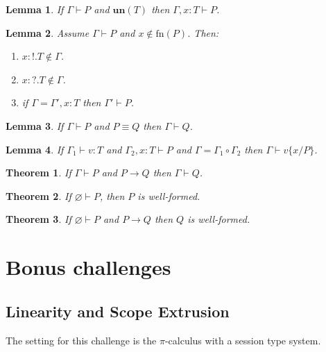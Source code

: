 \documentclass[a4paper]{article}
\newtheorem{lemma}{Lemma}
\newtheorem{theorem}{Theorem}
\newcommand{\freenames}[1]{\textrm{fn}(#1)}
\newcommand{\subst}[3]{#1\{#2/#3\}}
\newcommand{\scong}[2]{#1 \equiv #2}
\newcommand{\reduces}[2]{#1 \rightarrow #2}
\newcommand{\Tin}[1]{{?}.#1}
\newcommand{\Tout}[1]{{!}.#1}
\newcommand{\hastype}[2]{#1 : #2}
\newcommand{\un}[1]{\mathbf{un}(#1)}
\newcommand{\Cempty}{\varnothing}
\newcommand{\Cadd}[2]{#1, #2}
\newcommand{\Csplit}[2]{#1 \circ #2}
\newcommand{\types}[2]{#1 \vdash #2}
\begin{document}
\begin{lemma}
  If \( \types{\Gamma}{P} \) and \( \un{T} \) then \( \types{\Cadd{\Gamma}{\hastype{x}{T}}}{P} \).
\end{lemma}

\begin{lemma}
  Assume \( \types{\Gamma}{P} \) and \( x \notin \freenames{P} \).
  Then:
  \begin{enumerate}
  \item \( \hastype{x}{\Tout{T}} \notin \Gamma \).
  \item \( \hastype{x}{\Tin{T}} \notin \Gamma \).
  \item if \( \Gamma = \Cadd{\Gamma'}{\hastype{x}{T}} \) then \( \types{\Gamma'}{P} \).
  \end{enumerate}
\end{lemma}

\begin{lemma}
  If \( \types{\Gamma}{P} \) and \( \scong{P}{Q} \) then \( \types{\Gamma}{Q} \).
\end{lemma}

\begin{lemma}
  If \( \types{\Gamma_1}{\hastype{v}{T}} \) and \( \types{\Cadd{\Gamma_2}{\hastype{x}{T}}}{P} \) and \( \Gamma = \Csplit{\Gamma_1}{\Gamma_2} \) then \( \types{\Gamma}{\subst{v}{x}{P}} \).
\end{lemma}

\begin{theorem}
  If \( \types{\Gamma}{P} \) and \( \reduces{P}{Q} \) then \( \types{\Gamma}{Q} \).
\end{theorem}

\begin{theorem}
  If \( \types{\Cempty}{P} \), then \( P \) is well-formed.
\end{theorem}

\begin{theorem}
  If \( \types{\Cempty}{P} \) and \( \reduces{P}{Q} \) then \( Q \) is well-formed.
\end{theorem}

\section{Bonus challenges}

\subsection{Linearity and Scope Extrusion}
The setting for this challenge is the \( \pi \)-calculus with a session type system.
\end{document}
